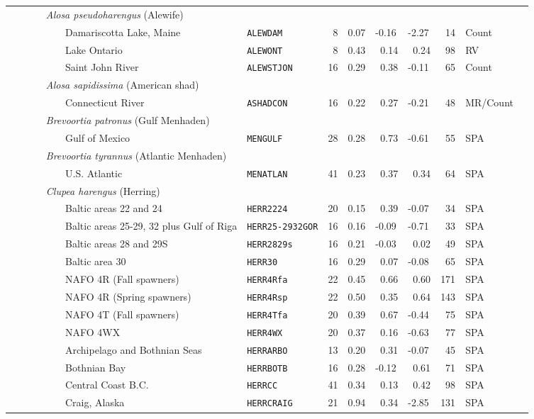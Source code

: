 \begin{flushleft}
\begin{tabular*}{7.1in}{llllllllll}
&{\it~~~~~Alosa pseudoharengus} (Alewife)&~&~&~&~&~&~&~  & \\ 
&~~~~~~~~~Damariscotta Lake, Maine&{\tt ALEWDAM}&~8&0.07&-0.16&-2.27&~14&Count  & \\ 
&~~~~~~~~~Lake Ontario&{\tt ALEWONT}&~8&0.43&~0.14&~0.24&~98&RV  & \\ 
&~~~~~~~~~Saint John River&{\tt ALEWSTJON}&16&0.29&~0.38&-0.11&~65&Count  & \\ 
&{\it~~~~~Alosa sapidissima} (American shad)&~&~&~&~&~&~&~  & \\ 
&~~~~~~~~~Connecticut River&{\tt ASHADCON}&16&0.22&~0.27&-0.21&~48&MR/Count  & \\ 
&{\it~~~~~Brevoortia patronus} (Gulf Menhaden)&~&~&~&~&~&~&~  & \\ 
&~~~~~~~~~Gulf of Mexico&{\tt MENGULF}&28&0.28&~0.73&-0.61&~55&SPA  & \\ 
&{\it~~~~~Brevoortia tyrannus} (Atlantic Menhaden)&~&~&~&~&~&~&~  & \\ 
&~~~~~~~~~U.S. Atlantic&{\tt MENATLAN}&41&0.23&~0.37&~0.34&~64&SPA  & \\ 
&{\it~~~~~Clupea harengus} (Herring)&~&~&~&~&~&~&~  & \\ 
&~~~~~~~~~Baltic areas 22 and 24&{\tt HERR2224}&20&0.15&~0.39&-0.07&~34&SPA  & \\ 
&~~~~~~~~~Baltic areas 25-29, 32 plus Gulf of Riga&{\tt HERR25-2932GOR}&16&0.16&-0.09&-0.71&~33&SPA  & \\ 
&~~~~~~~~~Baltic areas 28 and 29S&{\tt HERR2829s}&16&0.21&-0.03&~0.02&~49&SPA  & \\ 
&~~~~~~~~~Baltic area 30&{\tt HERR30}&16&0.29&~0.07&-0.08&~65&SPA  & \\ 
&~~~~~~~~~NAFO 4R (Fall spawners)&{\tt HERR4Rfa}&22&0.45&~0.66&~0.60&171&SPA  & \\ 
&~~~~~~~~~NAFO 4R (Spring spawners)&{\tt HERR4Rsp}&22&0.50&~0.35&~0.64&143&SPA  & \\ 
&~~~~~~~~~NAFO 4T (Fall spawners)&{\tt HERR4Tfa}&20&0.39&~0.67&-0.44&~75&SPA  & \\ 
&~~~~~~~~~NAFO 4WX&{\tt HERR4WX}&20&0.37&~0.16&-0.63&~77&SPA  & \\ 
&~~~~~~~~~Archipelago and Bothnian Seas&{\tt HERRARBO}&13&0.20&~0.31&-0.07&~45&SPA  & \\ 
&~~~~~~~~~Bothnian Bay&{\tt HERRBOTB}&16&0.28&-0.12&~0.61&~71&SPA  & \\ 
&~~~~~~~~~Central Coast B.C.&{\tt HERRCC}&41&0.34&~0.13&~0.42&~98&SPA  & \\ 
&~~~~~~~~~Craig, Alaska&{\tt HERRCRAIG}&21&0.94&~0.34&-2.85&131&SPA  & \\ 

\end{tabular*}
\end{flushleft}
